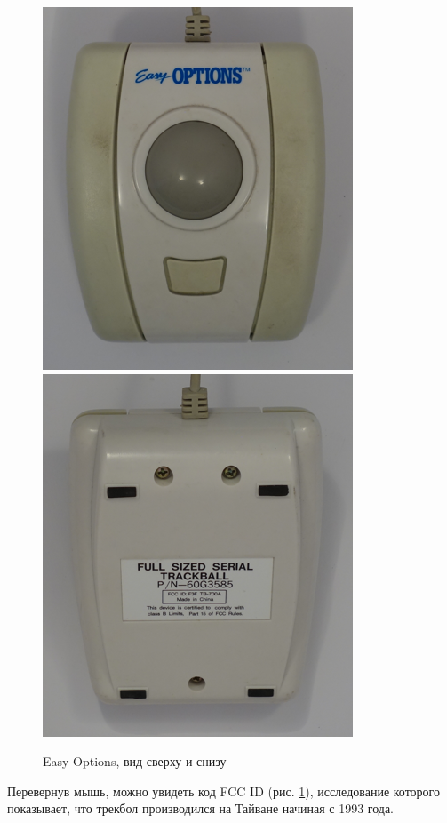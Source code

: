 \documentclass[11pt, a4paper]{article}
\begin{document}
\begin{figure}[h]
    \centering
    \includegraphics[scale=0.6]{1993_easy_options_trackball/opt7.png}
    \includegraphics[scale=0.6]{1993_easy_options_trackball/opt6.png}
    \caption{Easy Options, вид сверху и снизу}
    \label{fig:EasyOptionsTopBottom}
    \end{figure}

Перевернув мышь, можно увидеть код FCC ID (рис. \ref{fig:EasyOptionsTopBottom}), исследование которого показывает, что трекбол производился на Тайване начиная с 1993 года.
\end{document}
